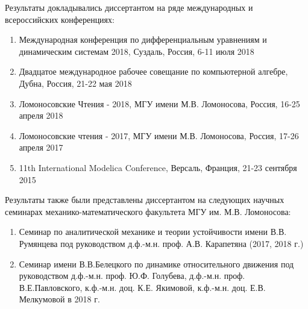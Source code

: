 Результаты докладывались диссертантом на ряде международных и всероссийских конференциях:
\begin{enumerate}
    \item Международная конференция по дифференциальным уравнениям и динамическим системам 2018, Суздаль, Россия, 6-11 июля 2018
    \item Двадцатое международное рабочее совещание по компьютерной алгебре, Дубна, Россия, 21-22 мая 2018
    \item Ломоносовские Чтения - 2018, МГУ имени М.В. Ломоносова, Россия, 16-25 апреля 2018
    \item Ломоносовские чтения - 2017, МГУ имени М.В. Ломоносова, Россия, 17-26 апреля 2017
    \item 11th International Modelica Conference, Версаль, Франция, 21-23 сентября 2015
\end{enumerate}
Результаты также были представлены диссертантом на следующих научных семинарах механико-математического факультета МГУ им. М.В. Ломоносова:
\begin{enumerate}
    \item Семинар по аналитической механике и теории устойчивости имени В.В. Румянцева под руководством д.ф.-м.н. проф. А.В. Карапетяна (2017, 2018 г.)
    \item Семинар имени В.В.Белецкого по динамике относительного движения под руководством д.ф.-м.н. проф. Ю.Ф. Голубева, д.ф.-м.н. проф. В.Е.Павловского, к.ф.-м.н. доц. К.Е. Якимовой, к.ф.-м.н. доц. Е.В. Мелкумовой в 2018 г.
\end{enumerate}
